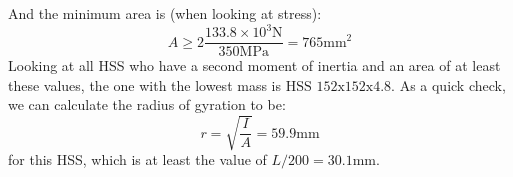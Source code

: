 \documentclass{article}
\begin{document}
    And the minimum area is (when looking at stress):
    \begin{equation}
        A \ge 2\frac{133.8\times 10^3\si{\newton}}{350\si{\mega\pascal}} = 765\si{\milli\meter\squared}
    \end{equation}
    Looking at all HSS who have a second moment of inertia and an area of at least these values, the one with the lowest mass is $\boxed{\text{HSS 152x152x4.8}}$. As a quick check, we can calculate the radius of gyration to be:
    \begin{equation}
        r = \sqrt{\frac{I}{A}}=59.9\si{\milli\meter}
        \label{eq:}
    \end{equation}
    for this HSS, which is at least the value of $L/200=30.1\si{\milli\meter}$.
    
\end{document}
